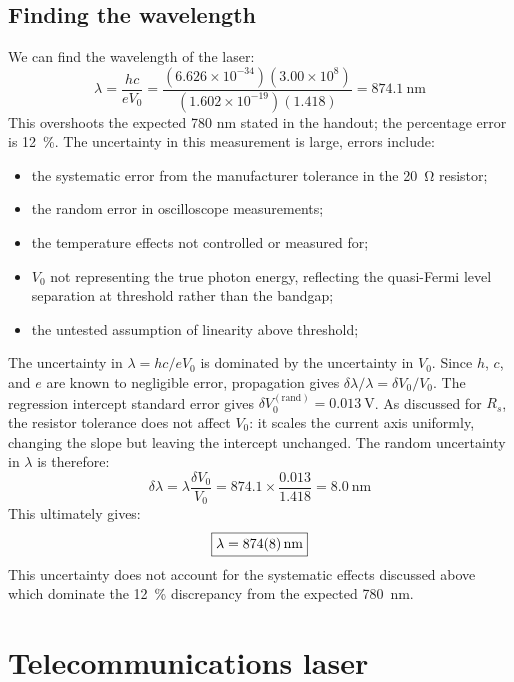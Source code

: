 \documentclass[a4paper, 10pt]{article}
\begin{document}
\subsection{Finding the wavelength}

We can find the wavelength of the laser:
\begin{equation*}
    \lambda  = \frac{hc}{eV_0}
    = \frac{(6.626\times10^{-34})(3.00\times10^{8})}
    {(1.602\times10^{-19})(1.418)}
    = \SI{874.1}{\nano\metre}
\end{equation*}
This overshoots the expected 780 nm stated in the handout; the percentage error is \SI{12}{\percent}. The uncertainty in this measurement is large, errors include:
\begin{itemize}[noitemsep]
    \item the systematic error from the manufacturer tolerance in the \SI{20}{\ohm} resistor;
    \item the random error in oscilloscope measurements;
    \item the temperature effects not controlled or measured for;
    \item $V_0$ not representing the true photon energy, reflecting the quasi-Fermi level separation at threshold rather than the bandgap;
    \item the untested assumption of linearity above threshold;
\end{itemize}
The uncertainty in $\lambda = hc / eV_0$ is dominated by the uncertainty in $V_0$. Since $h$, $c$, and $e$ are known to negligible error, propagation gives $\delta\lambda / \lambda = \delta V_0 / V_0$. The regression intercept standard error gives $\delta V_0^{(\mathrm{rand})} = \SI{0.013}{\volt}$. As discussed for $R_s$, the resistor tolerance does not affect $V_0$: it scales the current axis uniformly, changing the slope but leaving the intercept unchanged. The random uncertainty in $\lambda$ is therefore:
\begin{equation*}
    \delta\lambda = \lambda \frac{\delta V_0}{V_0} = 874.1 \times \frac{0.013}{1.418} = \SI{8.0}{\nano\metre}
\end{equation*}
This ultimately gives:
\begin{equation*}
    \boxed{\lambda = \SI{874 +- 8}{\nano\metre}}
\end{equation*}
This uncertainty does not account for the systematic effects discussed above which dominate the \SI{12}{\percent} discrepancy from the expected \SI{780}{\nano\metre}.

\section{Telecommunications laser}
\end{document}
